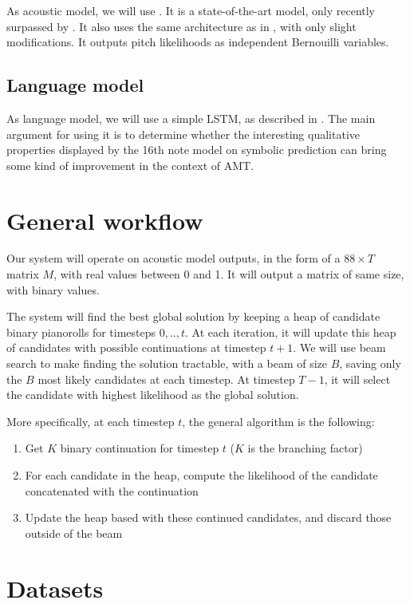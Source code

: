 \documentclass{article}
\begin{document}
As acoustic model, we will use \cite{Kelz2016}.
It is a state-of-the-art model, only recently surpassed by \cite{Hawthorne2018}.
It also uses the same architecture as in \cite{sigtia2016end}, with only slight modifications.
It outputs pitch likelihoods as independent Bernouilli variables.

\subsection{Language model}

As language model, we will use a simple LSTM, as described in \cite{Ycart2017}.
The main argument for using it is to determine whether the interesting qualitative properties displayed by the 16th note model on symbolic prediction can bring some kind of improvement in the context of AMT.


\section{General workflow}
\label{sec:workflow}

Our system will operate on acoustic model outputs, in the form of a $88\times T$ matrix $M$,
with real values between 0 and 1.
It will output a matrix of same size, with binary values.

The system will find the best global solution by keeping a heap of candidate binary pianorolls
for timesteps $0,..,t$.
At each iteration, it will update this heap of candidates with possible continuations at timestep $t+1$. We will use beam search to make finding the solution tractable, with a beam of size $B$, saving only the $B$ most likely candidates at each timestep.
At timestep $T-1$, it will select the candidate with highest likelihood as the global solution.

More specifically, at each timestep $t$, the general algorithm is the following:

\begin{enumerate}
\item Get $K$ binary continuation for timestep $t$ ($K$ is the branching factor)
\item For each candidate in the heap, compute the likelihood of the candidate concatenated with the continuation
\item Update the heap based with these continued candidates, and discard those outside of the beam
\end{enumerate}

\section{Datasets}
\end{document}
